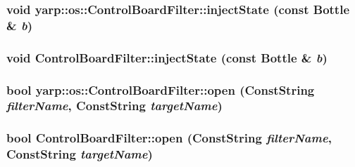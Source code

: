 \label{classyarp_1_1os_1_1_control_board_filter_a329bcebdddb5afbd7a5e7303e6941311}
\hypertarget{classyarp_1_1os_1_1_control_board_filter_a3386103cf773f04fb16fb451b8e301fe}{
\subsubsection[{injectState}]{\setlength{\rightskip}{0pt plus 5cm}void yarp::os::ControlBoardFilter::injectState (const Bottle \& {\em b})}}
\label{classyarp_1_1os_1_1_control_board_filter_a3386103cf773f04fb16fb451b8e301fe}
\hypertarget{classyarp_1_1os_1_1_control_board_filter_a379021d871cc1d375d8ea2107b74911d}{
\subsubsection[{injectState}]{\setlength{\rightskip}{0pt plus 5cm}void ControlBoardFilter::injectState (const Bottle \& {\em b})}}
\label{classyarp_1_1os_1_1_control_board_filter_a379021d871cc1d375d8ea2107b74911d}
\hypertarget{classyarp_1_1os_1_1_control_board_filter_a333ebfc5235d2e8dcf6e226a1d00924b}{
\subsubsection[{open}]{\setlength{\rightskip}{0pt plus 5cm}bool yarp::os::ControlBoardFilter::open (ConstString {\em filterName}, \/  ConstString {\em targetName})}}
\label{classyarp_1_1os_1_1_control_board_filter_a333ebfc5235d2e8dcf6e226a1d00924b}
\hypertarget{classyarp_1_1os_1_1_control_board_filter_a27f3aa5419bce6ad6e421ddcb2e52131}{
\subsubsection[{open}]{\setlength{\rightskip}{0pt plus 5cm}bool ControlBoardFilter::open (ConstString {\em filterName}, \/  ConstString {\em targetName})}}
